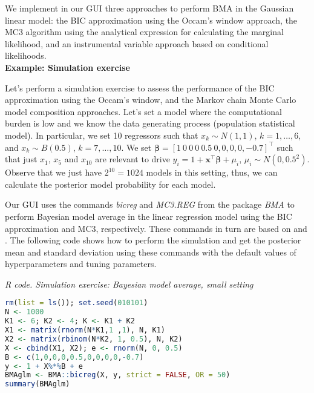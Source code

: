 We implement in our GUI three approaches to perform BMA in the Gaussian linear model: the BIC approximation using the Occam's window approach, the MC3 algorithm using the analytical expression for calculating the marginal likelihood, and an instrumental variable approach based on conditional likelihoods.\\

\textbf{Example: Simulation exercise}

Let's perform a simulation exercise to assess the performance of the BIC approximation using the Occam's window, and the Markov chain Monte Carlo model composition approaches. Let's set a model where the computational burden is low and we know the data generating process (population statistical model). In particular, we set 10 regressors such that $x_k\sim N(1, 1)$, $k =1,\dots,6$, and $x_k\sim B(0.5)$, $k=7,\dots,10$. We set $\bm{\beta}=[1 \ 0 \ 0 \ 0 \ 0.5 \ 0, 0, 0, 0, -0.7]^{\top}$ such that just $x_1$, $x_5$ and $x_{10}$ are relevant to drive $y_i=1+\bm{x}^{\top}\bm{\beta}+\mu_i$, $\mu_i\sim N(0,0.5^2)$. Observe that we just have $2^{10}=1024$ models in this setting, thus, we can calculate the posterior model probability for each model. 

Our GUI uses the commands \textit{bicreg} and \textit{MC3.REG} from the package \textit{BMA} to perform Bayesian model average in the linear regression model using the BIC approximation and MC3, respectively. These commands in turn are based on \cite{Raftery1995} and \cite{Raftery1997}. The following code shows how to perform the simulation and get the posterior mean and standard deviation using these commands with the default values of hyperparameters and tuning parameters.

\begin{tcolorbox}[enhanced,width=4.67in,center upper,
	fontupper=\large\bfseries,drop shadow southwest,sharp corners]
	\textit{R code. Simulation exercise: Bayesian model average, small setting}
	\begin{VF}
		\begin{lstlisting}[language=R]
rm(list = ls()); set.seed(010101)
N <- 1000
K1 <- 6; K2 <- 4; K <- K1 + K2
X1 <- matrix(rnorm(N*K1,1 ,1), N, K1)
X2 <- matrix(rbinom(N*K2, 1, 0.5), N, K2)
X <- cbind(X1, X2); e <- rnorm(N, 0, 0.5)
B <- c(1,0,0,0,0.5,0,0,0,0,-0.7)
y <- 1 + X%*%B + e
BMAglm <- BMA::bicreg(X, y, strict = FALSE, OR = 50) 
summary(BMAglm)
\end{lstlisting}
	\end{VF}
\end{tcolorbox} 

